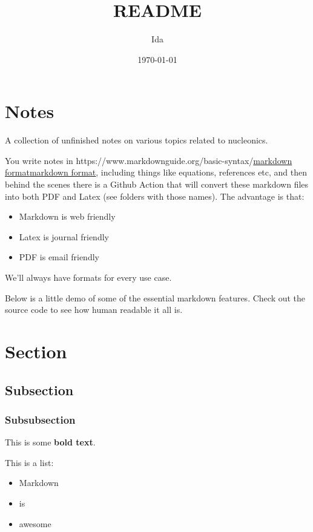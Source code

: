 \documentclass[
]{article}
\title{README}
\author{Ida}
\date{\today}  %
\let\oldhref\href
\renewcommand{\href}[2]{\ifx#1\urlprefix\oldhref{#1}{#2}\else\uline{\oldhref{#1}{#2}}\fi}
\renewcommand{\[}{\begin{equation}}
\renewcommand{\]}{\end{equation}}
\providecommand{\tightlist}{%
  \setlength{\itemsep}{0pt}\setlength{\parskip}{0pt}}
\begin{document}
\maketitle

\section{Notes}\label{notes}

A collection of unfinished notes on various topics related to
nucleonics.

You write notes in
\href{https://www.markdownguide.org/basic-syntax/}{markdown format},
including things like equations, references etc, and then behind the
scenes there is a Github Action that will convert these markdown files
into both PDF and Latex (see folders with those names). The advantage is
that:

\begin{itemize}
\tightlist
\item
  Markdown is web friendly
\item
  Latex is journal friendly
\item
  PDF is email friendly
\end{itemize}

We'll always have formats for every use case.

Below is a little demo of some of the essential markdown features. Check
out the source code to see how human readable it all is.

\section{Section}\label{section}

\subsection{Subsection}\label{subsection}

\subsubsection{Subsubsection}\label{subsubsection}

This is some \textbf{bold text}.

This is a list:

\begin{itemize}
\tightlist
\item
  Markdown
\item
  is
\item
  awesome
\end{itemize}
\end{document}

